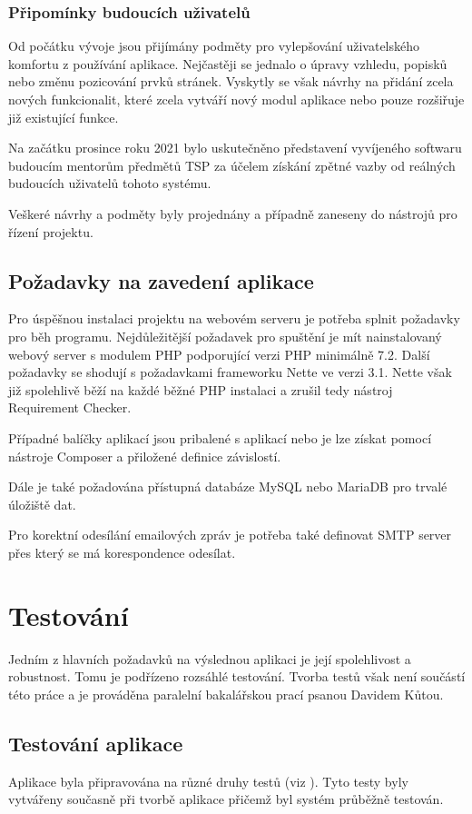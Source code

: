 \documentclass[czech,BP]{thesiskiv}
\begin{document}
	\subsection{Připomínky budoucích uživatelů}
	\par Od počátku vývoje jsou přijímány podměty pro vylepšování uživatelského komfortu z používání aplikace. Nejčastěji se jednalo o úpravy vzhledu, popisků nebo změnu pozicování prvků stránek. Vyskytly se však návrhy na přidání zcela nových funkcionalit, které zcela vytváří nový modul aplikace nebo pouze rozšiřuje již existující funkce.
	\par Na začátku prosince roku 2021 bylo uskutečněno představení vyvíjeného softwaru budoucím mentorům předmětů TSP za účelem získání zpětné vazby od reálných budoucích uživatelů tohoto systému.
	\par Veškeré návrhy a podměty byly projednány a případně zaneseny do nástrojů pro řízení projektu.
	\section{Požadavky na zavedení aplikace}
	\par Pro úspěšnou instalaci projektu na webovém serveru je potřeba splnit požadavky pro běh programu. Nejdůležitější požadavek pro spuštění je mít nainstalovaný webový server s modulem PHP podporující verzi PHP minimálně 7.2. Další požadavky se shodují s požadavkami frameworku Nette ve verzi 3.1. Nette však již spolehlivě běží na každé běžné PHP instalaci a zrušil tedy nástroj Requirement Checker.
	\par Případné balíčky aplikací jsou pribalené s aplikací nebo je lze získat pomocí nástroje Composer a přiložené definice závislostí.
	\par Dále je také požadována přístupná databáze MySQL nebo MariaDB pro trvalé úložiště dat.
	\par Pro korektní odesílání emailových zpráv je potřeba také definovat SMTP server přes který se má korespondence odesílat.
\chapter{Testování}
	\par Jedním z hlavních požadavků na výslednou aplikaci je její spolehlivost a robustnost. Tomu je podřízeno rozsáhlé testování. Tvorba testů však není součástí této práce a je prováděna paralelní bakalářskou prací  psanou Davidem Kůtou.
	\section{Testování aplikace}
	\par Aplikace byla připravována na různé druhy testů (viz ). Tyto testy byly vytvářeny současně při tvorbě aplikace přičemž byl systém průběžně testován.
\end{document}
